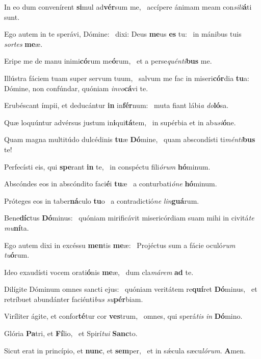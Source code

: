 \item In eo dum convenírent \textbf{si}mul ad\textbf{vér}sum me,~\psstar{} accípere ánimam meam con\textit{sili}\textbf{á}ti sunt.
\item Ego autem in te sperávi, Dómine:~\pscross{} dixi: Deus \textbf{me}us \textbf{es} tu:~\psstar{} in mánibus tuis \textit{sortes} \textbf{me}æ.
\item Eripe me de manu inimi\textbf{có}rum me\textbf{ó}rum,~\psstar{} et a perse\textit{quénti}\textbf{bus} me.
\item Illústra fáciem tuam super servum tuum,~\pscross{} salvum me fac in miseri\textbf{cór}dia \textbf{tu}a:~\psstar{} Dómine, non confúndar, quóniam \textit{invo}\textbf{cá}vi te.
\item Erubéscant ímpii, et deducántur \textbf{in} in\textbf{fér}num:~\psstar{} muta fiant lábi\textit{a} \textit{do}\textbf{ló}sa.
\item Quæ loquúntur advérsus justum in\textbf{i}qui\textbf{tá}tem,~\psstar{} in supérbia et in ab\textit{usi}\textbf{ó}ne.
\item Quam magna multitúdo dulcédinis \textbf{tu}æ \textbf{Dó}mine,~\psstar{} quam abscondísti ti\textit{ménti}\textbf{bus} te!
\item Perfecísti eis, qui \textbf{spe}rant \textbf{in} te,~\psstar{} in conspéctu fili\textit{órum} \textbf{hó}minum.
\item Abscóndes eos in abscóndito faci\textbf{é}i \textbf{tu}æ~\psstar{} a conturbati\textit{óne} \textbf{hó}minum.
\item Próteges eos in taber\textbf{ná}culo \textbf{tu}o~\psstar{} a contradictió\textit{ne} \textit{lin}\textbf{guá}rum.
\item Bene\textbf{díc}tus \textbf{Dó}minus:~\psstar{} quóniam mirificávit misericórdiam suam mihi in civitá\textit{te} \textit{mu}\textbf{ní}ta.
\item Ego autem dixi in excéssu \textbf{men}tis \textbf{me}æ:~\psstar{} Projéctus sum a fácie oculó\textit{rum} \textit{tu}\textbf{ó}rum.
\item Ideo exaudísti vocem orati\textbf{ó}nis \textbf{me}æ,~\psstar{} dum cla\textit{márem} \textbf{ad} te.
\item Dilígite Dóminum omnes sancti ejus:~\pscross{} quóniam veritátem re\textbf{quí}ret \textbf{Dó}minus,~\psstar{} et retríbuet abundánter faciénti\textit{bus} \textit{su}\textbf{pér}biam.
\item Viríliter ágite, et confor\textbf{té}tur cor \textbf{ves}trum,~\psstar{} omnes, qui sperá\textit{tis} \textit{in} \textbf{Dó}mino.
\item Glória \textbf{Pa}tri, et \textbf{Fí}lio,~\psstar{} et Spirí\textit{tui} \textbf{Sanc}to.
\item Sicut erat in princípio, et \textbf{nunc}, et \textbf{sem}per,~\psstar{} et in sǽcula sæcu\textit{lórum}. \textbf{A}men.
